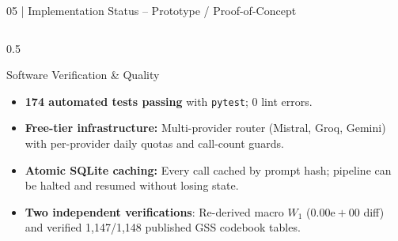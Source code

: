 \documentclass[10pt,aspectratio=169]{beamer}
\begin{document}
\begin{frame}{05 | Implementation Status -- Prototype / Proof-of-Concept}
\begin{columns}[T]
\begin{column}{0.5\textwidth}
\begin{block}{Software Verification \& Quality}
                \scriptsize
                \begin{itemize}\itemsep4pt
                    \item \textbf{174 automated tests passing} with \texttt{pytest}; 0 lint errors.
                    \item \textbf{Free-tier infrastructure:} Multi-provider router (Mistral, Groq, Gemini) with per-provider daily quotas and call-count guards.
                    \item \textbf{Atomic SQLite caching:} Every call cached by prompt hash; pipeline can be halted and resumed without losing state.
                    \item \textbf{Two independent verifications}: Re-derived macro $W_1$ ($0.00\mathrm{e}{+}00$ diff) and verified 1,147/1,148 published GSS codebook tables.
                \end{itemize}
            \end{block}
        \end{column}
    \end{columns}
\end{frame}
\end{document}
